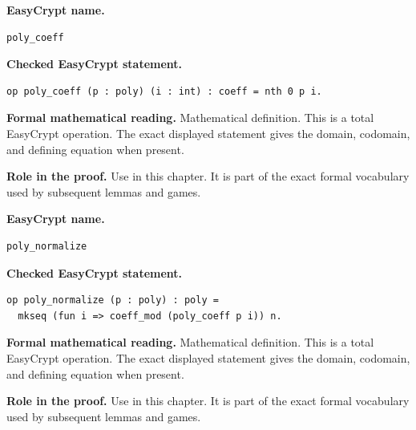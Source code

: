\begin{formaldefinition}
\noindent\textbf{EasyCrypt name.}
\begin{lstlisting}[language=EasyCrypt,basicstyle=\ttfamily\scriptsize]
poly_coeff
\end{lstlisting}
\noindent\textbf{Checked EasyCrypt statement.}
\begin{lstlisting}[language=EasyCrypt,basicstyle=\ttfamily\scriptsize]
op poly_coeff (p : poly) (i : int) : coeff = nth 0 p i.
\end{lstlisting}
\noindent\textbf{Formal mathematical reading.}
Mathematical definition. This is a total EasyCrypt operation.  The exact displayed statement gives the domain, codomain, and defining equation when present.

\noindent\textbf{Role in the proof.}
Use in this chapter. It is part of the exact formal vocabulary used by subsequent lemmas and games.

\end{formaldefinition}

\begin{formaldefinition}
\noindent\textbf{EasyCrypt name.}
\begin{lstlisting}[language=EasyCrypt,basicstyle=\ttfamily\scriptsize]
poly_normalize
\end{lstlisting}
\noindent\textbf{Checked EasyCrypt statement.}
\begin{lstlisting}[language=EasyCrypt,basicstyle=\ttfamily\scriptsize]
op poly_normalize (p : poly) : poly =
  mkseq (fun i => coeff_mod (poly_coeff p i)) n.
\end{lstlisting}
\noindent\textbf{Formal mathematical reading.}
Mathematical definition. This is a total EasyCrypt operation.  The exact displayed statement gives the domain, codomain, and defining equation when present.

\noindent\textbf{Role in the proof.}
Use in this chapter. It is part of the exact formal vocabulary used by subsequent lemmas and games.

\end{formaldefinition}

